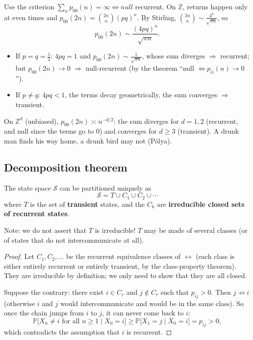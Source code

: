 \begin{remark}
Use the criterion $\sum_n p_{00}(n) = \infty \iff null$ recurrent. On $\mathbb{Z}$, returns happen only at even times and $p_{00}(2n) = \binom{2n}{n}(pq)^n$. By Stirling, $\binom{2n}{n} \sim \frac{4^n}{\sqrt{\pi n}}$, so
\[
p_{00}(2n) \sim \frac{(4pq)^n}{\sqrt{\pi n}}.
\]
\begin{itemize}
    \item If $p = q = \frac12$: $4pq = 1$ and $p_{00}(2n) \sim \frac{1}{\sqrt{\pi n}}$, whose sum diverges $\Rightarrow$ recurrent; but $p_{00}(2n) \to 0$ $\Rightarrow$ null-recurrent (by the theorem ``null $\iff p_{ii}(n) \to 0$'').
    \item If $p \neq q$: $4pq < 1$, the terms decay geometrically, the sum converges $\Rightarrow$ transient.
\end{itemize}
On $\mathbb{Z}^d$ (unbiased), $p_{00}(2n) \asymp n^{-d/2}$: the sum diverges for $d = 1, 2$ (recurrent, and null since the terms go to $0$) and converges for $d \geq 3$ (transient). A drunk man finds his way home, a drunk bird may not (Pólya).
\end{remark}

\subsection{Decomposition theorem}

\begin{theorem}
The state space $\mathcal{S}$ can be partitioned uniquely as
\[
\mathcal{S} = T \cup C_1 \cup C_2 \cup \cdots
\]
where $T$ is the set of \textbf{transient} states, and the $C_k$ are \textbf{irreducible closed sets of recurrent states}.
\end{theorem}

Note: we do not assert that $T$ is irreducible! $T$ may be made of several classes (or of states that do not intercommunicate at all).

\begin{proof}
Let $C_1, C_2, \dots$ be the recurrent equivalence classes of $\leftrightarrow$ (each class is either entirely recurrent or entirely transient, by the class-property theorem). They are irreducible by definition; we only need to show that they are all closed.

Suppose the contrary: there exist $i \in C_r$ and $j \notin C_r$ such that $p_{ij} > 0$. Then $j \not\to i$ (otherwise $i$ and $j$ would intercommunicate and would be in the same class). So once the chain jumps from $i$ to $j$, it can never come back to $i$:
\[
\mathbb{P}\big[X_n \neq i \text{ for all } n \geq 1 \mid X_0 = i\big] \geq \mathbb{P}\big[X_1 = j \mid X_0 = i\big] = p_{ij} > 0,
\]
which contradicts the assumption that $i$ is recurrent.
\end{proof}

